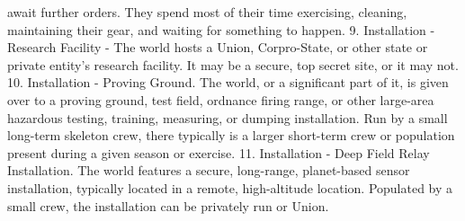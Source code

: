         await further orders. They spend most of their time exercising, cleaning, maintaining their
        gear, and waiting for something to happen.
    9.  Installation - Research Facility - The world hosts a Union, Corpro-State, or other state or
        private entity's research facility. It may be a secure, top secret site, or it may not.
    10. Installation - Proving Ground. The world, or a significant part of it, is given over to a
        proving ground, test field, ordnance firing range, or other large-area hazardous testing,
        training, measuring, or dumping installation. Run by a small long-term skeleton crew, there
        typically is a larger short-term crew or population present during a given season or
        exercise.
    11. Installation - Deep Field Relay Installation. The world features a secure, long-range,
        planet-based sensor installation, typically located in a remote, high-altitude location.
        Populated by a small crew, the installation can be privately run or Union.




